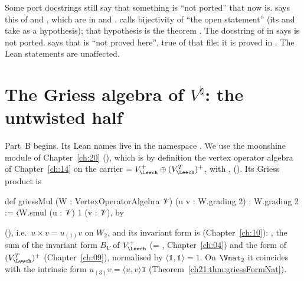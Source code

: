 \begin{warning}[title={Out-of-date port docstrings}]
Some port docstrings still say that something is ``not ported'' that now is.
 says this of  and , which are in
 and .   calls
bijectivity of  ``the open statement'' (its  and
 take  as a hypothesis); that hypothesis
is the theorem .  The docstring of  in
 says  is not ported.
 says that  is ``not proved here'', true of that file;
it is proved in .  The Lean statements are unaffected.
\end{warning}

\section{The Griess algebra of \texorpdfstring{$V^\natural$}{V-natural}: the untwisted half}\label{ch21:sec:vnatside}

Part~B begins.  Its Lean names live in the namespace .  We use
the moonshine module  of Chapter~\ref{ch:20} (),
which is by definition the vertex operator algebra of Chapter~\ref{ch:14} on the carrier
 $=V_\Leech^+\oplus(V_\Leech^T)^+$, with ,
 ().  Its Griess product is
\begin{leancode}
def griessMul (W : VertexOperatorAlgebra 𝒱) (u v : W.grading 2) : W.grading 2 :=
  ⟨W.smul (u : 𝒱) 1 (v : 𝒱), by
\end{leancode}
(), i.e.\ $u\times v=u_{(1)}v$ on $W_2$, and its invariant form is
 (Chapter~\ref{ch:10}): ,
the sum of the invariant form $B_V$ of $V_\Leech^+$ (= , Chapter~\ref{ch:04}) and the
form  of $(V_\Leech^T)^+$ (Chapter~\ref{ch:09}), normalised by $\langle\mathbb1,\mathbb1\rangle=1$.
On $\Vnat_2$ it coincides with the intrinsic form $u_{(3)}v=\langle u,v\rangle\mathbb1$
(Theorem~\ref{ch21:thm:griessFormNat}).

